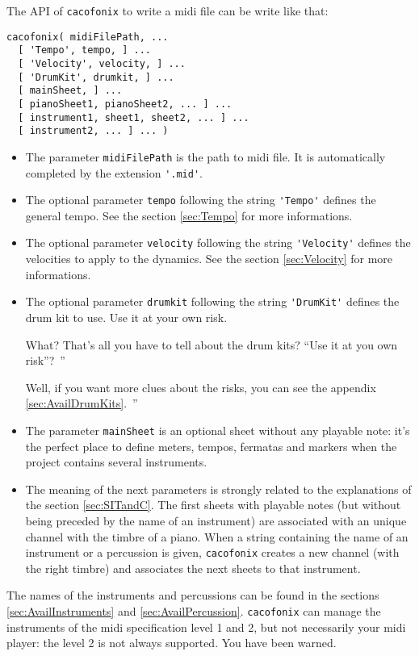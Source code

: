 \documentclass{article}
\newenvironment{meenv}{ \par \noindent \makebox[6em][r]{ \textcolor{mecolor}{Me}: `` --~}}{~''}
\newenvironment{myselfenv}{ \par \noindent \makebox[6em][r]{ \textcolor{myselfcolor}{Myself}: `` --~}}{~''}
\newcommand{\me}[1]{\begin{meenv}#1\end{meenv}}
\newcommand{\myself}[1]{\begin{myselfenv}#1\end{myselfenv}}
\begin{document}
The API of \lstinline!cacofonix! to write a midi file can be write like that:
\begin{lstlisting}
cacofonix( midiFilePath, ...
  [ 'Tempo', tempo, ] ...
  [ 'Velocity', velocity, ] ...
  [ 'DrumKit', drumkit, ] ...
  [ mainSheet, ] ...
  [ pianoSheet1, pianoSheet2, ... ] ...
  [ instrument1, sheet1, sheet2, ... ] ...
  [ instrument2, ... ] ... )
\end{lstlisting}
\begin{itemize}
  \item The parameter \lstinline!midiFilePath! is the path to midi file. It is automatically completed by the extension \lstinline!'.mid'!.
  \item The optional parameter \lstinline!tempo! following the string \lstinline!'Tempo'! defines the general tempo. See the section \ref{sec:Tempo} for more informations.
  \item The optional parameter \lstinline!velocity! following the string \lstinline!'Velocity'! defines the velocities to apply to the dynamics. See the section \ref{sec:Velocity} for more informations.
  \item The optional parameter \lstinline!drumkit! following the string \lstinline!'DrumKit'! defines the drum kit to use. Use it at your own risk.
    \myself{What? That's all you have to tell about the drum kits? ``Use it at you own risk''?}
    \me{Well, if you want more clues about the risks, you can see the appendix \ref{sec:AvailDrumKits}.}
  \item The parameter \lstinline!mainSheet! is an optional sheet without any playable note: it's the perfect place to define meters, tempos, fermatas and markers when the project contains several instruments.
  \item The meaning of the next parameters is strongly related to the explanations of the section \ref{sec:SITandC}. The first sheets with playable notes (but without being preceded by the name of an instrument) are associated with an unique channel with the timbre of a piano. When a string containing the name of an instrument or a percussion is given, \lstinline!cacofonix! creates a new channel (with the right timbre) and associates the next sheets to that instrument.
\end{itemize}

The names of the instruments and percussions can be found in the sections \ref{sec:AvailInstruments} and \ref{sec:AvailPercussion}. \lstinline!cacofonix! can manage the instruments of the midi specification level 1 and 2, but not necessarily your midi player: the level 2 is not always supported. You have been warned.
\end{document}
